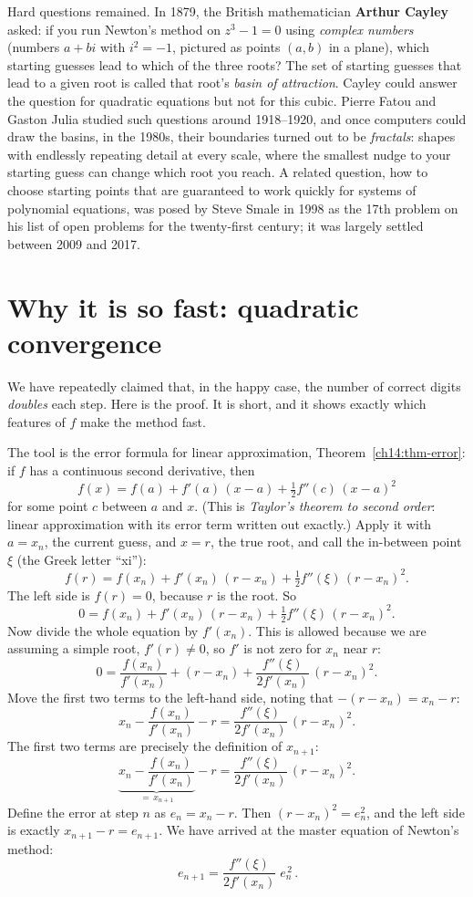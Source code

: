 \begin{historybox}
Hard questions remained. In 1879, the British mathematician \textbf{Arthur Cayley} asked: if you run Newton's method on $z^3 - 1 = 0$ using \emph{complex numbers} (numbers $a + bi$ with $i^2 = -1$, pictured as points $(a,b)$ in a plane), which starting guesses lead to which of the three roots? The set of starting guesses that lead to a given root is called that root's \emph{basin of attraction}. Cayley could answer the question for quadratic equations but not for this cubic. Pierre Fatou and Gaston Julia studied such questions around 1918--1920, and once computers could draw the basins, in the 1980s, their boundaries turned out to be \emph{fractals}: shapes with endlessly repeating detail at every scale, where the smallest nudge to your starting guess can change which root you reach. A related question, how to choose starting points that are guaranteed to work quickly for systems of polynomial equations, was posed by Steve Smale in 1998 as the 17th problem on his list of open problems for the twenty-first century; it was largely settled between 2009 and 2017.
\end{historybox}

\section{Why it is so fast: quadratic convergence}
\label{ch19:quadratic}

We have repeatedly claimed that, in the happy case, the number of correct digits
\emph{doubles} each step. Here is the proof. It is short, and it shows exactly
which features of $f$ make the method fast.

The tool is the error formula for linear approximation,
Theorem~\ref{ch14:thm-error}: if $f$ has a continuous second derivative, then
\[
  f(x) = f(a) + f'(a)\,(x-a) + \tfrac12 f''(c)\,(x-a)^2
\]
for some point $c$ between $a$ and $x$. (This is \emph{Taylor's theorem to second
order}: linear approximation with its error term written out exactly.) Apply it
with $a = x_n$, the current guess, and $x = r$, the true root, and call the
in-between point $\xi$ (the Greek letter ``xi''):
\[
  f(r) = f(x_n) + f'(x_n)\,(r - x_n) + \tfrac12 f''(\xi)\,(r - x_n)^2.
\]
The left side is $f(r) = 0$,
because $r$ is the root. So
\[
  0 = f(x_n) + f'(x_n)\,(r - x_n) + \tfrac12 f''(\xi)\,(r - x_n)^2.
\]
Now divide the whole equation by $f'(x_n)$. This is allowed because we are
assuming a simple root, $f'(r) \ne 0$, so $f'$ is not zero for $x_n$ near $r$:
\[
  0 = \frac{f(x_n)}{f'(x_n)} + (r - x_n) + \frac{f''(\xi)}{2 f'(x_n)}\,(r - x_n)^2.
\]
Move the first two terms to the left-hand side, noting that $-(r - x_n) = x_n - r$:
\[
  x_n - \frac{f(x_n)}{f'(x_n)} - r = \frac{f''(\xi)}{2 f'(x_n)}\,(r - x_n)^2.
\]
The first two terms are precisely the definition of $x_{n+1}$:
\[
  \underbrace{x_n - \frac{f(x_n)}{f'(x_n)}}_{=\,x_{n+1}} - r
  = \frac{f''(\xi)}{2 f'(x_n)}\,(r - x_n)^2.
\]
Define the error at step $n$ as $e_n = x_n - r$. Then $(r - x_n)^2 = e_n^2$, and the
left side is exactly $x_{n+1} - r = e_{n+1}$. We have arrived at the master equation
of Newton's method:
\[
  \boxed{\,e_{n+1} = \frac{f''(\xi)}{2 f'(x_n)}\; e_n^{\,2}\,}.
\]

